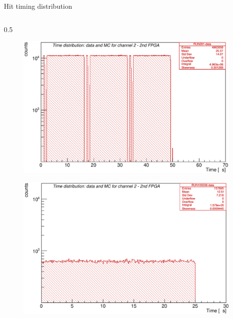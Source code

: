 \documentclass{beamer}
\begin{document}
\begin{frame}{Hit timing distribution}
\begin{columns}
            \begin{column}{0.5\framewidth}
                \begin{figure}[h!]
                  \centering
                            \hspace*{-1em}
                \includegraphics[width=0.85\columnwidth]{figures/png/Screenshot_20241013_115554.png}
                  \label{fig:enter-label} 
                  \end{figure} 
                  \vspace{-4mm}
                  \begin{figure}[h!]
                    \centering
                              \hspace*{-1em}
                  \includegraphics[width=0.85\columnwidth]{figures/png/Screenshot_20241013_115705.png}
                    \label{fig:enter-label} 
                    \end{figure} 
            \end{column}
        \end{columns}
        \begin{columns}


\end{columns}
\end{frame}
\end{document}
